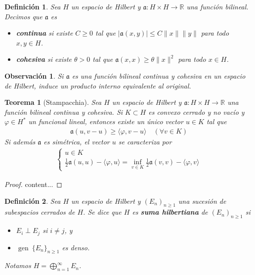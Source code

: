 \documentclass[11pt]{report}
\theoremstyle{colored}
\newtheorem{definition}{Definición}[section]
\newtheorem{theorem}{Teorema}[section]
\newtheorem{remark}{Observación}[section]
\newcommand{\R}{\mathbb{R}}
\newcommand{\paint}[1]{\color{color}{#1}}
\begin{document}
\begin{definition} Sea $H$ un espacio de Hilbert y $\mathfrak{a} : H \times H \to \R$ una función bilineal. Decimos que $\mathfrak{a}$ es
\begin{itemize}
\item[$\paint{\bullet}$] \textbf{continua} si existe $C \geq 0$ tal que $|\mathfrak{a}(x,y)| \leq C \|x\|\|y\|$ para todo $x,y \in H$. 
\item[$\paint{\bullet}$] \textbf{cohesiva} si existe $\theta > 0$ tal que $\mathfrak{a}(x,x) \geq \theta \|x\|^2$ para todo $x  \in H$.
\end{itemize}
\end{definition}
\begin{remark} Si $\mathfrak{a}$ es una función bilineal continua y cohesiva en un espacio de Hilbert, induce un producto interno equivalente al original.
\end{remark}

\begin{theorem}[Stampacchia] Sea $H$ un espacio de Hilbert y $\mathfrak{a} : H \times H \to \R$ una función bilineal continua y cohesiva. Si $K \subset H$ es convexo cerrado y no vacío y $\varphi \in H^*$ un funcional lineal, entonces existe un único vector $u \in K$ tal que
\begin{align*}
\mathfrak{a}(u,v-u) \geq \langle \varphi, v-u \rangle \quad (\forall v \in K)
\end{align*}
Si además $\mathfrak{a}$ es simétrica, el vector $u$ se caracteriza por
\begin{align*}
\begin{cases}
u \in K\\
\frac{1}{2}\mathfrak{a}(u,u) - \langle \varphi, u \rangle = \inf_{v \in K}\frac{1}{2}\mathfrak{a}(v,v) - \langle \varphi, v \rangle
\end{cases}
\end{align*}
\end{theorem}
\begin{proof}
content...
\end{proof}

\begin{definition} Sea $H$ un espacio de Hilbert y $(E_n)_{n \geq 1}$ una sucesión de subespacios cerrados de $H$. Se dice que $H$ es \textbf{suma hilbertiana} de $(E_n)_{n \geq 1}$ si 
\begin{itemize}
\item[$\paint{\bullet}$] $E_i \perp E_j$ si $i \neq j$, y
\item[$\paint{\bullet}$] $\operatorname{gen} \ \{E_n\}_{n \geq 1}$ es denso.
\end{itemize}
Notamos $H = \bigoplus_{n = 1}^\infty E_n$.
\end{definition}
\end{document}
